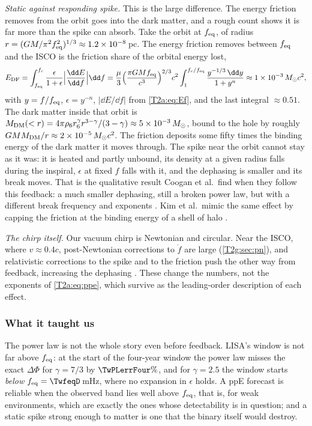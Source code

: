 \emph{Static against responding spike.} This is the large difference. The energy friction removes from the orbit goes into the dark matter, and a rough count shows it is far more than the spike can absorb. Take the orbit at $f_{\rm eq}$, of radius $r=(GM/\pi^2f_{\rm eq}^2)^{1/3}\approx1.2\times10^{-8}$\,pc. The energy friction removes between $f_{\rm eq}$ and the ISCO is the friction share of the orbital energy lost,
\[
  E_{\rm DF}=\int_{f_{\rm eq}}^{f_c}\frac{\epsilon}{1+\epsilon}\Big\lvert\frac{\dd E}{\dd f}\Big\rvert\dd f
  =\frac\mu3\Big(\frac{\pi GMf_{\rm eq}}{c^3}\Big)^{2/3}c^2\int_1^{f_c/f_{\rm eq}}\frac{y^{-1/3}\,\dd y}{1+y^{n}}
  \approx1\times10^{-3}\,M_\odot c^2,
\]
with $y=f/f_{\rm eq}$, $\epsilon=y^{-n}$, $\lvert\dd E/\dd f\rvert$ from \eqref{T2a:eq:Ef}, and the last integral $\approx0.51$. The dark matter inside that orbit is $M_{\rm DM}(<r)=4\pi\rho_6r_6^\gamma r^{3-\gamma}/(3-\gamma)\approx5\times10^{-3}\,M_\odot$, bound to the hole by roughly $GMM_{\rm DM}/r\approx2\times10^{-5}\,M_\odot c^2$. The friction deposits some fifty times the binding energy of the dark matter it moves through. The spike near the orbit cannot stay as it was: it is heated and partly unbound, its density at a given radius falls during the inspiral, $\epsilon$ at fixed $f$ falls with it, and the dephasing is smaller and its break moves. That is the qualitative result Coogan et al.\ find when they follow this feedback: a much smaller dephasing, still a broken power law, but with a different break frequency and exponents \cite[Sec.~IV]{Coogan2022}. Kim et al.\ mimic the same effect by capping the friction at the binding energy of a shell of halo \cite[Sec.~IV C]{Kim2023}.

\emph{The chirp itself.} Our vacuum chirp is Newtonian and circular. Near the ISCO, where $v\approx0.4c$, post-Newtonian corrections to $\dot f$ are large (\cref{T2g:sec:pn}), and relativistic corrections to the spike and to the friction push the other way from feedback, increasing the dephasing \cite{Speeney2022}. These change the numbers, not the exponents of \eqref{T2a:eq:ppe}, which survive as the leading-order description of each effect.

\subsubsection*{What it taught us}
The power law is not the whole story even before feedback. LISA's window is not far above $f_{\rm eq}$: at the start of the four-year window the power law misses the exact $\Delta\Phi$ for $\gamma=7/3$ by $\TwPLerrFour\%$, and for $\gamma=2.5$ the window starts \emph{below} $f_{\rm eq}=\TwfeqD$\,mHz, where no expansion in $\epsilon$ holds. A ppE forecast is reliable when the observed band lies well above $f_{\rm eq}$, that is, for weak environments, which are exactly the ones whose detectability is in question; and a static spike strong enough to matter is one that the binary itself would destroy.

